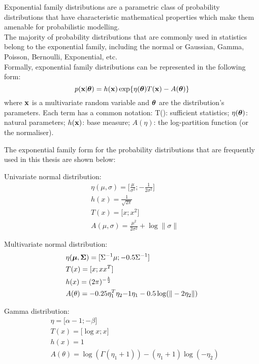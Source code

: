 Exponential family distributions are a parametric class of probability distributions that have characteristic mathematical properties which make them amenable for probabilistic modelling.\\
The majority of probability distributions that are commonly used in statistics belong to the exponential family, including the normal or Gaussian, Gamma, Poisson, Bernoulli, Exponential, etc.\\
Formally, exponential family distributions can be represented in the following form:
\begin{equation} \label{eq:exponential_family}
	p({\bf x}|\mbox{\boldmath $\theta$}) = h({\bf x}) \exp \{ \eta(\mbox{\boldmath $\theta$}) T({\bf x}) - A(\mbox{\boldmath $\theta$}) \}
\end{equation}
where ${\bf x}$ is a multivariate random variable and $\mbox{\boldmath $\theta$}$ are the distribution's parameters. Each term has a common notation: T(\bfx): sufficient statistics; $\eta(\mbox{\boldmath $\theta$})$: natural parameters; $h({\bf x})$: base measure; $A(\eta)$: the log-partition function (or the normaliser).

The exponential family form for the probability distributions that are frequently used in this thesis are shown below:

Univariate normal distribution:
\begin{align*}
	& \eta(\mu,\sigma) = \lbrack \frac{\mu}{\sigma^2}; -\frac{1}{2\sigma^2} \rbrack \\
	& h(x) = \frac{1}{\sqrt{2\pi}} \\
	& T(x) = \lbrack x; x^2 \rbrack \\
	& A(\mu,\sigma) = \frac{\mu^2}{2\sigma^2} + \log \| \sigma \|
\end{align*}

Multivariate normal distribution:
\begin{align*}
	& \eta(\mbox{\boldmath $\mu$},\mbox{\boldmath $\Sigma$})  = \lbrack\Sigma^{-1} \mu; -0.5\Sigma^{-1} \rbrack \\
	& T(x) = \lbrack x; xx^T \rbrack \\
	& h(x) = (2\pi)^{-\frac{k}{2}} \\
	& A(\theta) = -0.25\eta_1^T \eta_2{-1} \eta_1 - 0.5\log(\|-2\eta_2\|)
\end{align*}

Gamma distribution:
\begin{align*}
	& \eta = \lbrack \alpha - 1; -\beta \rbrack \\
	& T(x) = \lbrack \log x; x \rbrack \\
	& h(x) = 1 \\
	& A(\theta) = \log(\Gamma(\eta_1 + 1)) - (\eta_1 + 1) \log(-\eta_2)
\end{align*}

